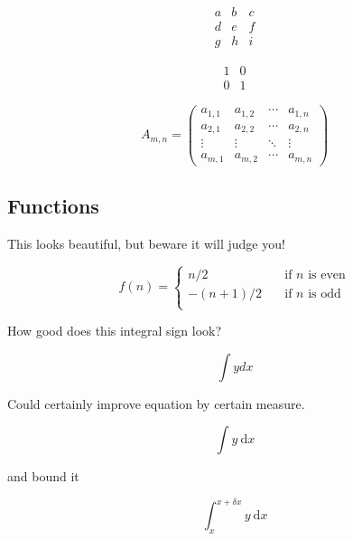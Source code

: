 \documentclass[11pt]{article}
\begin{document}
\begin{equation}
\begin{matrix}
	a & b & c \\
	d & e & f \\
	g & h & i
\end{matrix}
\end{equation}

\begin{equation}
\begin{matrix}
	1 & 0 \\
	0 & 1
\end{matrix}
\end{equation}

\begin{equation}
A_{m,n} =
\begin{pmatrix}
	a_{1,1} & a_{1,2} & \cdots & a_{1,n} \\
	a_{2,1} & a_{2,2} & \cdots & a_{2,n} \\
	\vdots  & \vdots  & \ddots & \vdots  \\
	a_{m,1} & a_{m,2} & \cdots & a_{m,n}
\end{pmatrix}
\end{equation}

\subsection{Functions}

This looks beautiful, but beware it will judge you!

\[ f(n) =
\begin{cases}
n/2       & \quad \text{if } n \text{ is even}\\
-(n+1)/2  & \quad \text{if } n \text{ is odd}\\
\end{cases}
\]

How good does this integral sign look?

$$\int y dx$$

Could certainly improve equation by certain measure.

$$\int y \ \mathrm{d}x$$

and bound it

$$\int^{x + \delta{x}}_{x} y \ \mathrm{d}x$$
\end{document}
